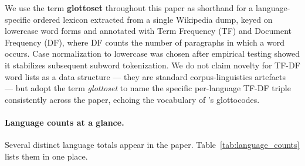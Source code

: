 \documentclass[11pt]{article}
\begin{document}
We use the term \textbf{glottoset} throughout this paper as shorthand for a language-specific ordered lexicon extracted from a single Wikipedia dump, keyed on lowercase word forms and annotated with Term Frequency (TF) and Document Frequency (DF), where DF counts the number of paragraphs in which a word occurs. Case normalization to lowercase was chosen after empirical testing showed it stabilizes subsequent subword tokenization. We do not claim novelty for TF-DF word lists as a data structure --- they are standard corpus-linguistics artefacts~\citep{gutierrez-vasques-etal-2023-languages} --- but adopt the term \emph{glottoset} to name the specific per-language TF-DF triple consistently across the paper, echoing the vocabulary of \citet{glottolog}'s glottocodes.

\paragraph{Language counts at a glance.} Several distinct language totals appear in the paper. Table~\ref{tab:language_counts} lists them in one place.
\end{document}
